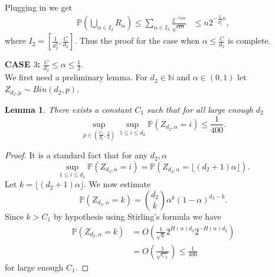 \documentclass[11pt,reqno]{amsart}
\newtheorem{lemma}{Lemma}
\begin{document}
Plugging in we get
\begin{align}\label{fexp1}
\mathbb{P}\left(\bigcup_{\alpha\in I_2}R_{\alpha}\right)\le \sum_{\alpha\in I_2}\frac{2^{-5\alpha n}}{\sqrt{\alpha n}}
& \le n 2^{-\frac{5}{d^2_2}n},
\end{align} 
where $I_2=[\frac{1}{d_2^2},\frac{C}{d_2}]$. 
Thus the proof for the case when $\alpha \le \frac{C}{d_2}$ is complete.

\textbf{CASE $3$:} $\frac{C}{d_2} \leq \alpha \leq \frac{1}{2}.$\\

We first need a preliminary lemma. For $d_2 \in \mathbb{N}$ and $\alpha \in (0,1)$ let $Z_{d_2,p}\sim Bin(d_2,p).$
\begin{lemma}\label{supbound}There exists a constant $C_1$ such that for all large enough $d_2$  
$$\sup_{p \in (\frac{C_1}{d_2}, \frac{2}{3}) }\sup_{1\le i\le d_2}\mathbb{P}(Z_{d_2,\alpha}=i)\le \frac{1}{400}.$$
 \end{lemma}
 
\begin{proof} It is a standard fact that for any $d_2,\alpha$
$$\sup_{1\le i\le d_2}\mathbb{P}(Z_{d_2,\alpha}=i) =\mathbb{P}(Z_{d_2,\alpha}=\lfloor{(d_2+1)\alpha \rfloor}).$$ 
Let $k=\lfloor{(d_2+1)\alpha \rfloor}.$
We now estimate $$\mathbb{P}(Z_{d_2,\alpha}=k)={d_2 \choose k} \alpha^{k}(1-\alpha )^{d_2-k}.$$ Since $k>C_1$ by hypothesis using Stirling's formula we have 
\begin{align*}
\mathbb{P}(Z_{d_2,\alpha}=k)&=O\left(\frac{1}{\sqrt{k}}2^{H(\alpha)d_2}2^{-H(\alpha)d_2}\right)\\
&=O\left(\frac{1}{\sqrt{C_1}}\right) \le \frac{1}{400} 
\end{align*}
 for large enough $C_1.$ 
\end{proof}
 
\end{document}

